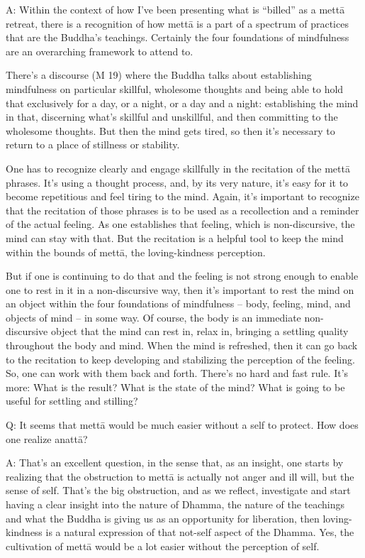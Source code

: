 \qaspace
A: Within the context of how I’ve been presenting what is “billed” as a
mettā retreat, there is a recognition of how mettā is a part of a
spectrum of practices that are the Buddha’s teachings. Certainly the
four foundations of mindfulness are an overarching framework to attend
to.

There’s a discourse (M 19) where the Buddha talks about establishing
mindfulness on particular skillful, wholesome thoughts and being able to
hold that exclusively for a day, or a night, or a day and a night:
establishing the mind in that, discerning what’s skillful and
unskillful, and then committing to the wholesome thoughts. But then the
mind gets tired, so then it’s necessary to return to a place of
stillness or stability.

One has to recognize clearly and engage skillfully in the recitation of
the mettā phrases. It’s using a thought process, and, by its very
nature, it’s easy for it to become repetitious and feel tiring to the
mind. Again, it’s important to recognize that the recitation of those
phrases is to be used as a recollection and a reminder of the actual
feeling. As one establishes that feeling, which is non-discursive, the
mind can stay with that. But the recitation is a helpful tool to keep
the mind within the bounds of mettā, the loving-kindness perception.

But if one is continuing to do that and the feeling is not strong enough
to enable one to rest in it in a non-discursive way, then it’s important
to rest the mind on an object within the four foundations of mindfulness
– body, feeling, mind, and objects of mind – in some way. Of course, the
body is an immediate non-discursive object that the mind can rest in,
relax in, bringing a settling quality throughout the body and mind. When
the mind is refreshed, then it can go back to the recitation to keep
developing and stabilizing the perception of the feeling. So, one can
work with them back and forth. There’s no hard and fast rule. It’s more:
What is the result? What is the state of the mind? What is going to be
useful for settling and stilling?

\qaspace
Q: It seems that mettā would be much easier without a self to protect.
How does one realize anattā?

\qaspace
A: That’s an excellent question, in the sense that, as an insight, one
starts by realizing that the obstruction to mettā is actually not anger
and ill will, but the sense of self. That’s the big obstruction, and as
we reflect, investigate and start having a clear insight into the nature
of Dhamma, the nature of the teachings and what the Buddha is giving us
as an opportunity for liberation, then loving-kindness is a natural
expression of that not-self aspect of the Dhamma. Yes, the cultivation
of mettā would be a lot easier without the perception of self.

